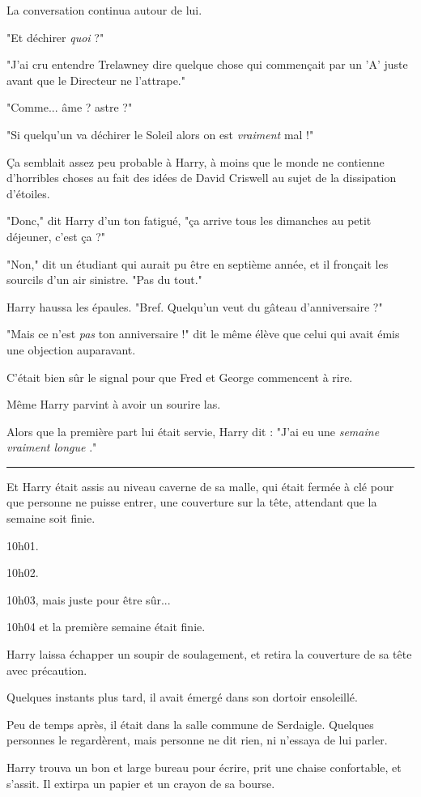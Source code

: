 La conversation continua autour de lui.

"Et déchirer \emph{quoi}  ?"

"J'ai cru entendre Trelawney dire quelque chose qui commençait par un 'A' juste avant que le Directeur ne l'attrape."

"Comme... âme ? astre ?"

"Si quelqu'un va déchirer le Soleil alors on est \emph{vraiment}  mal !"

Ça semblait assez peu probable à Harry, à moins que le monde ne contienne d'horribles choses au fait des idées de David Criswell au sujet de la dissipation d'étoiles.

"Donc," dit Harry d'un ton fatigué, "ça arrive tous les dimanches au petit déjeuner, c'est ça ?"

"Non," dit un étudiant qui aurait pu être en septième année, et il fronçait les sourcils d'un air sinistre. "Pas du tout."

Harry haussa les épaules. "Bref. Quelqu'un veut du gâteau d'anniversaire ?"

"Mais ce n'est \emph{pas}  ton anniversaire !" dit le même élève que celui qui avait émis une objection auparavant.

C'était bien sûr le signal pour que Fred et George commencent à rire.

Même Harry parvint à avoir un sourire las.

Alors que la première part lui était servie, Harry dit : "J'ai eu une \emph{semaine vraiment longue} ."
\par\noindent\rule{\textwidth}{0.4pt}
Et Harry était assis au niveau caverne de sa malle, qui était fermée à clé pour que personne ne puisse entrer, une couverture sur la tête, attendant que la semaine soit finie.

10h01.

10h02.

10h03, mais juste pour être sûr...

10h04 et la première semaine était finie.

Harry laissa échapper un soupir de soulagement, et retira la couverture de sa tête avec précaution.

Quelques instants plus tard, il avait émergé dans son dortoir ensoleillé.

Peu de temps après, il était dans la salle commune de Serdaigle. Quelques personnes le regardèrent, mais personne ne dit rien, ni n'essaya de lui parler.

Harry trouva un bon et large bureau pour écrire, prit une chaise confortable, et s'assit. Il extirpa un papier et un crayon de sa bourse.

